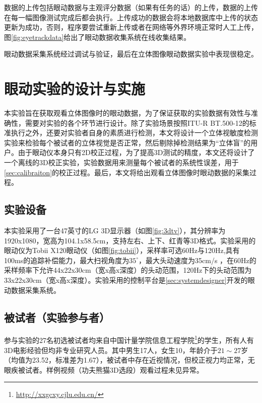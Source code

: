 数据的上传包括眼动数据与主观评分数据（如果有任务的话）的上传，数据的上传在每一幅图像测试完成后都会执行。上传成功的数据会将本地数据库中上传的状态更新为成功，否则，程序要尝试重新上传或者在网络等外界环境正常时人工上传，图\ref{fig:eyetrackdata}给出了眼动数据收集系统在线收集结果。

眼动数据采集系统经过调试与验证，最后在立体图像眼动数据实验中表现很稳定。
\section{眼动实验的设计与实施}
\label{sec:conductexperiment}
本实验旨在获取观看立体图像时的眼动数据，为了保证获取的实验数据有效性与准确性，需要对实验的各个环节进行设计。除了实验场景按照ITU-R BT.500-12的标准执行之外，还要对实验者自身的素质进行检测，本文将设计一个立体视敏度检测实验来检验每个被试者的立体视觉是否正常，然后剔除掉检测结果为“立体盲”的用户。由于眼动仪本身只有2D校正过程，为了提高3D测试的精度，本文还将设计了一个离线的3D校正实验，实验数据用来测量每个被试者的系统性误差，用于\ref{sec:calibraiton}的校正过程。最后，本文将给出观看立体图像时眼动数据的采集过程。
\subsection{实验设备}
\label{sec:eyetrackerandTV}
本实验采用了一台47英寸的LG 3D显示器（如图\ref{fig:3dtv}），其分辨率为1920x1080，宽高为104.1x58.5cm，支持左右、上下、红青等3D格式。实验采用的眼动仪为Tobii X120眼动仪（如图\ref{fig:tobii}），采样率可选60Hz与120Hz,具有100ms的追踪补偿能力，最大扫视角度为${35^ \circ }$，最大头动速度为35cm/s ，在60Hz的采样频率下允许44x22x30cm（宽x高x深度）的头动范围，120Hz下的头动范围为33x22x30cm（宽x高x深度）。实验采用的控制平台是\ref{sec:systemdesigner}开发的眼动数据采集系统。
\begin{figure}
  \centering
\end{figure}

\subsection{被试者（实验参与者）}
\label{sec:subjects}
参与实验的27名初选被试者均来自中国计量学院信息工程学院\footnote{\url{http://xxgcxy.cjlu.edu.cn/}}的学生，所有人有3D电影经验但均非专业研究人员。其中男生17人，女生10，年龄介于$21 \sim 27岁$（均值为23.52，标准差为1.67），被试者中存在近视情况，但校正视力均正常，无眼疾被试者。样例视频（功夫熊猫3D选段）观看过程未见异常。
